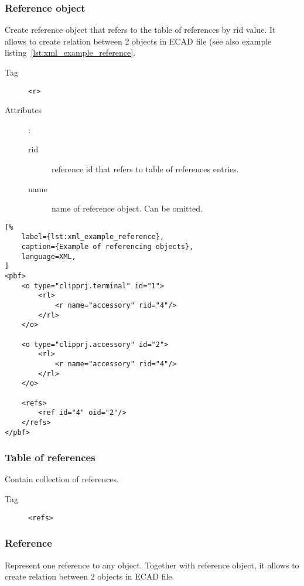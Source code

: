 \documentclass[%
	a4paper,
	oneside,
	listof=numbered,
	parskip=half,
	headsepline=true,
	footsepline=false,
	0.7headlines,
	]{scrbook}
\begin{document}
\subsubsection{Reference object}

Create reference object that refers to the table of references by rid value.
It allows to create relation between 2 objects in ECAD file (see also example listing~\ref{lst:xml_example_reference}.

\begin{description}
	\item[Tag] \verb|<r>|
	\item[Attributes]:
	
	\begin{description}
		\item[rid] reference id that refers to table of references entries.
		\item[name] name of reference object.
		Can be omitted.
	\end{description}
\end{description}

\begin{lstlisting}[%
	label={lst:xml_example_reference},
	caption={Example of referencing objects},
	language=XML,
]
<pbf>
	<o type="clipprj.terminal" id="1">
		<rl>
			<r name="accessory" rid="4"/>
		</rl>
	</o>

	<o type="clipprj.accessory" id="2">
		<rl>
			<r name="accessory" rid="4"/>
		</rl>
	</o>

	<refs>
		<ref id="4" oid="2"/>
	</refs>
</pbf>
\end{lstlisting}

\subsubsection{Table of references}

Contain collection of references.

\begin{description}
	\item[Tag] \verb|<refs>|
\end{description}

\subsubsection{Reference}

Represent one reference to any object.
Together with reference object, it allows to create relation between 2 objects in ECAD file.
\end{document}
